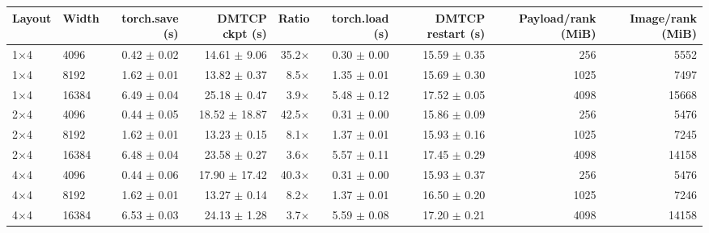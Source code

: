 \begin{tabular}{llrrrrrrr}
\toprule
Layout & Width & torch.save (s) & DMTCP ckpt (s) & Ratio & torch.load (s) & DMTCP restart (s) & Payload/rank (MiB) & Image/rank (MiB) \\
\midrule
1$\times$4 & 4096 & 0.42 $\pm$ 0.02 & 14.61 $\pm$ 9.06 & 35.2$\times$ & 0.30 $\pm$ 0.00 & 15.59 $\pm$ 0.35 & 256 & 5552 \\
1$\times$4 & 8192 & 1.62 $\pm$ 0.01 & 13.82 $\pm$ 0.37 & 8.5$\times$ & 1.35 $\pm$ 0.01 & 15.69 $\pm$ 0.30 & 1025 & 7497 \\
1$\times$4 & 16384 & 6.49 $\pm$ 0.04 & 25.18 $\pm$ 0.47 & 3.9$\times$ & 5.48 $\pm$ 0.12 & 17.52 $\pm$ 0.05 & 4098 & 15668 \\
2$\times$4 & 4096 & 0.44 $\pm$ 0.05 & 18.52 $\pm$ 18.87 & 42.5$\times$ & 0.31 $\pm$ 0.00 & 15.86 $\pm$ 0.09 & 256 & 5476 \\
2$\times$4 & 8192 & 1.62 $\pm$ 0.01 & 13.23 $\pm$ 0.15 & 8.1$\times$ & 1.37 $\pm$ 0.01 & 15.93 $\pm$ 0.16 & 1025 & 7245 \\
2$\times$4 & 16384 & 6.48 $\pm$ 0.04 & 23.58 $\pm$ 0.27 & 3.6$\times$ & 5.57 $\pm$ 0.11 & 17.45 $\pm$ 0.29 & 4098 & 14158 \\
4$\times$4 & 4096 & 0.44 $\pm$ 0.06 & 17.90 $\pm$ 17.42 & 40.3$\times$ & 0.31 $\pm$ 0.00 & 15.93 $\pm$ 0.37 & 256 & 5476 \\
4$\times$4 & 8192 & 1.62 $\pm$ 0.01 & 13.27 $\pm$ 0.14 & 8.2$\times$ & 1.37 $\pm$ 0.01 & 16.50 $\pm$ 0.20 & 1025 & 7246 \\
4$\times$4 & 16384 & 6.53 $\pm$ 0.03 & 24.13 $\pm$ 1.28 & 3.7$\times$ & 5.59 $\pm$ 0.08 & 17.20 $\pm$ 0.21 & 4098 & 14158 \\
\bottomrule
\end{tabular}
